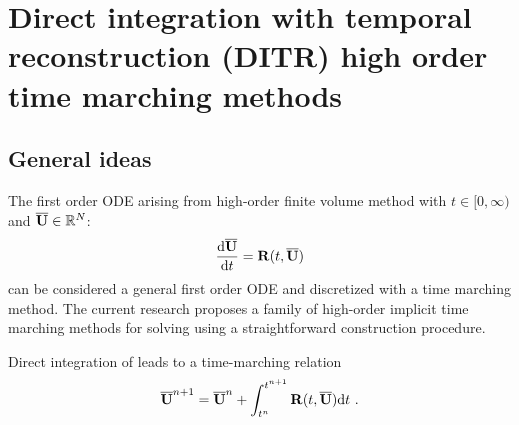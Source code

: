 

\section{Direct integration with temporal reconstruction (DITR)
    high order time marching methods}
\label{sec:HIRK}

\subsection{General ideas}

The first order ODE  arising
from high-order finite volume method
with
$t\in[0,\infty)$ and $\overline{\mathbf{U}}\in \mathbb{R}^N$:
\begin{equation*}
    \frac{\dd \overline{\mathbf{U}}}{\dd t} = \mathbf{R}(t, \overline{\mathbf{U}})
\end{equation*}
can be considered a general first order ODE and 
discretized with a time marching method. 
The current research proposes a family of high-order implicit time marching 
methods for solving  
using a straightforward construction procedure.

Direct integration of 
leads to a time-marching relation
\begin{equation}
    \overline{\mathbf{U}}^{n+1} = \overline{\mathbf{U}}^{n} + \int_{t^n}^{t^{n+1}}{
    \mathbf{R}(t, \overline{\mathbf{U}}) \dd t
    }\ .
    \label{eq:DI}
\end{equation}

